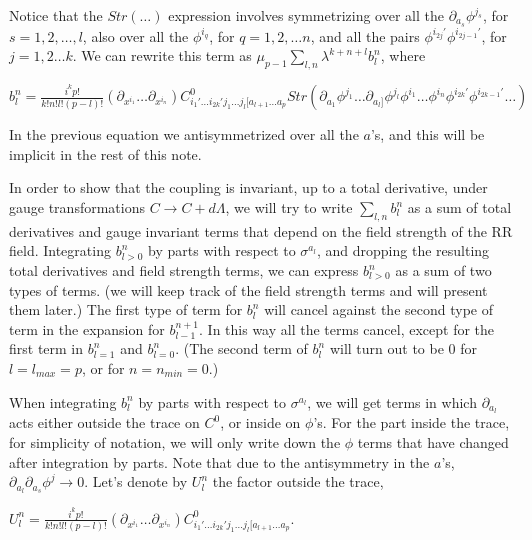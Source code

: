 \documentclass[a4paper,12pt]{article}
\begin{document}
Notice that the $Str\left(\ldots \right)$ expression involves symmetrizing over all the $\partial_{a_s}\phi^{j_{s}}$, for $s=1,2,\ldots ,l$,  also over all the $\phi^{i_q}$, for $q=1,2,\ldots n$, and all the pairs $\phi^{i_{2j}'}\phi^{i_{2j-1}'}$, for $j=1,2\ldots k$. 
We can rewrite this term as $\mu_{p-1}\sum_{l,n}\lambda^{k+n+l} b^n_l$, where 
\begin{center}
$b^n_l=\frac{i^k p!}{k!n!l!(p-l)!}\left(\partial_{x^{i_1}}\ldots \partial_{x^{i_n}}\right) C^0_{i_1'\ldots i_{2k}'j_1\ldots j_l[a_{l+1}\ldots a_p} Str \left(\partial_{a_1}\phi^{j_1}\ldots \partial_{a_l]}\phi^{j_l}\phi^{i_1}\ldots \phi^{i_n}\phi^{i_{2k}'}\phi^{i_{2k-1}'}\ldots \right)$ 
\end{center}   
In the previous equation we antisymmetrized over all the $a$'s, and this will be implicit in the rest of this note. 

In order to show that the coupling is invariant, up to a total derivative,  under gauge transformations $C\rightarrow C+d\Lambda$, we will try to write $\sum_{l,n} b^n_l$ as a sum of total derivatives  and gauge invariant  terms that depend on  the field strength of the RR field.  Integrating $b^n_{l>0}$ by parts with respect to $\sigma^{a_l}$, and  dropping the resulting total derivatives and field strength terms, we can express $b^n_{l>0}$ as a sum of two types of terms. (we will keep track of the field strength terms  and will present them  later.)  The first type of term for $b^n_l$ will cancel against the second type of term in the expansion for $b^{n+1}_{l-1}$. In this way all the terms cancel, except  for the first term in $b^n_{l=1}$ and $b^n_{l=0}$. (The second term of $b^n_l$ will turn out to be 0 for $l=l_{max}=p$, or for $n=n_{min}=0$.)  
   
When integrating $b^n_l$ by parts with respect to $\sigma^{a_l}$, we will get terms in which $\partial_{a_l}$ acts either outside the trace on $C^0$, or inside on $\phi$'s. For the part inside the trace, for simplicity of notation, we will only write down the $\phi$ terms that have changed  after integration by parts. 
Note that due to the antisymmetry in the $a$'s, $\partial_{a_l}\partial_{a_s}\phi^j \rightarrow 0 $. 
Let's denote by $U^n_l$ the factor outside the trace, 
\begin{center}
$U^n_l =\frac{i^kp!}{k!n!l!(p-l)!}\left(\partial_{x^{i_1}}\ldots \partial_{x^{i_n}}\right) C^0_{i_1'\ldots i_{2k}'j_1\ldots j_l[a_{l+1}\ldots a_p}.$ 
\end{center}
\end{document}
